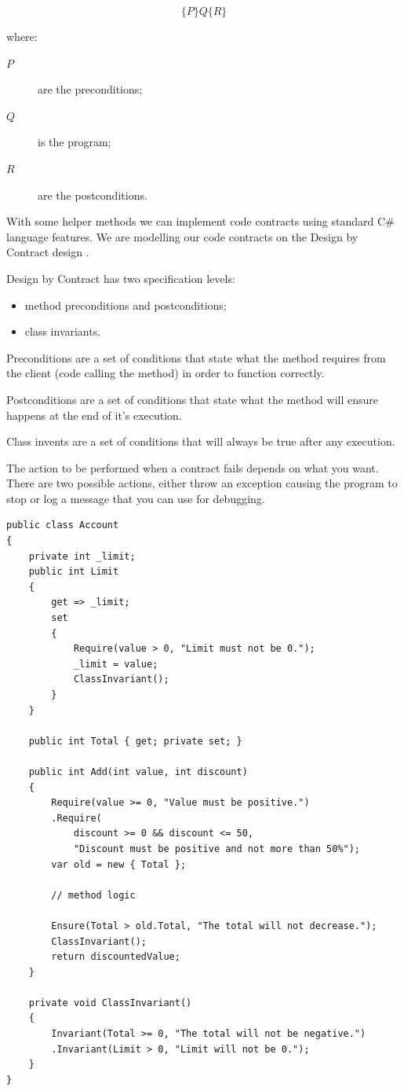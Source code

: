 \[
	\{P\}Q\{R\}
\]

where:
\begin{description}
	\item [\(P\)] are the preconditions;
	\item [\(Q\)] is the program;
	\item [\(R\)] are the postconditions.
\end{description}

With some helper methods we can implement code contracts using standard C\# language
features. We are modelling our code contracts on the Design by Contract design 
\parencite{ObjectOrientedSoftwareConstruction}.

Design by Contract has two specification levels:
\begin{itemize}
	\item method preconditions and postconditions;
	\item class invariants.
\end{itemize}

Preconditions are a set of conditions that state what the method requires from 
the client (code calling the method) in order to function correctly.

Postconditions are a set of conditions that state what the method will ensure 
happens at the end of it's execution.

Class invents are a set of conditions that will always be true after any 
execution. 

The action to be performed when a contract fails depends on what you want. There 
are two possible actions, either throw an exception causing the program to stop or
log a message that you can use for debugging.

\vspace{5mm} %

\begin{lstlisting}[frame=single]
public class Account
{
    private int _limit;
    public int Limit
    {
        get => _limit;
        set
        {
            Require(value > 0, "Limit must not be 0.");
            _limit = value;
            ClassInvariant();
        }
    }

    public int Total { get; private set; }

    public int Add(int value, int discount)
    {
        Require(value >= 0, "Value must be positive.")
        .Require(
            discount >= 0 && discount <= 50, 
            "Discount must be positive and not more than 50%");
        var old = new { Total };

        // method logic

        Ensure(Total > old.Total, "The total will not decrease.");
        ClassInvariant();
        return discountedValue;
    }

    private void ClassInvariant()
    {
        Invariant(Total >= 0, "The total will not be negative.")
        .Invariant(Limit > 0, "Limit will not be 0.");
    }
}
\end{lstlisting}

